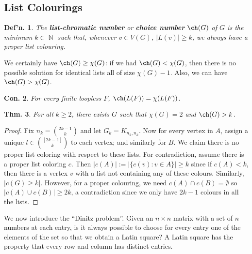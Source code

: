 \documentclass[12pt, a4paper]{book}
\DeclareMathOperator{\N}{\mathbb{N}}
\newtheorem{theorem}{Thm.}[section]
\newtheorem{conjecture}[theorem]{Con.}
\newtheorem{definition}[theorem]{Def'n.}
\theoremstyle{nonumberplain}
\newtheorem{proof}{Proof}
\begin{document}
\subsection{List Colourings}
\begin{definition}
    The \textbf{list-chromatic number} or \textbf{choice number} $\ch(G)$ of $G$ is the minimum $k\in\N$ such that, whenever $v\in V(G)$, $|L(v)|\geq k$, we always have a proper list colouring.
\end{definition}
We certainly have $\ch(G)\geq\chi(G)$: if we had $\ch(G)<\chi(G)$, then there is no possible solution for identical lists all of size $\chi(G)-1$.
Also, we can have $\ch(G)>\chi(G)$.
\begin{center}
\end{center}
\begin{conjecture}
    For every finite loopless $F$, $\ch(L(F))=\chi(L(F))$.
\end{conjecture}
\begin{theorem}
    For all $k\geq 2$, there exists $G$ such that $\chi(G)=2$ and $\ch(G)>k$.
\end{theorem}
\begin{proof}
    Fix $n_k=\binom{2k-1}{k}$ and let $G_k=K_{n_k,n_k}$.
    Now for every vertex in $A$, assign a unique $l\in\binom{[2k-1]}{k}$ to each vertex; and similarly for $B$.
    We claim there is no proper list coloring with respect to these lists.
    For contradiction, assume there is a proper list coloring $c$.
    Then $|c(A)|:=|\{c(v):v\in A\}|\geq k$ since if $c(A)<k$, then there is a vertex $v$ with a list not containing any of these colours.
    Similarly, $|c(G)\geq k|$.
    However, for a proper colouring, we need $c(A)\cap c(B)=\emptyset$ so $|c(A)\cup c(B)|\geq 2k$, a contradiction since we only have $2k-1$ colours in all the lists.
\end{proof}
We now introduce the ``Dinitz problem''.
Given an $n\times n$ matrix with a set of $n$ numbers at each entry, is it always possible to choose for every entry one of the elements of the set so that we obtain a Latin square?
A Latin square has the property that every row and column has distinct entries.
\end{document}
